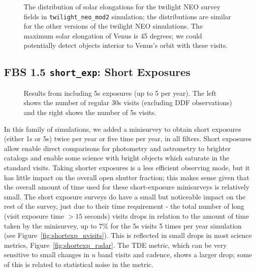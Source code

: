 \begin{figure}
\caption{The distribution of solar elongations for the twilight NEO survey fields in {\tt twilight\_neo\_mod2} simulation; the distributions are similar for the other versions of the twilight NEO simulations. The maximum solar elongation of Venus is 45 degrees; we could potentially detect objects interior to Venus's orbit with these visits.}
\label{fig:twilight_solarelong}
\end{figure}

\subsection{FBS 1.5 {\tt short\_exp}: Short Exposures}\label{ss:shortexp}

\begin{figure}
\caption{Results from including 5s exposures (up to 5 per year). The left shows the number of regular 30s visits (excluding DDF observations) and the right shows the number of 5s visits.}
\end{figure}

In this family of simulations, we added a minisurvey to obtain short exposures (either 1s or 5s) twice per year or five time per year, in all filters. Short exposures allow enable direct comparisons for photometry and astrometry to brighter catalogs and enable some science with bright objects which saturate in the standard visits. Taking shorter exposures is a less efficient observing mode, but it has little impact on the overall open shutter fraction; this makes sense given that the overall amount of time used for these short-exposure minisurveys is relatively small. The short exposure surveys do have a small but noticeable impact on the rest of the survey, just due to their time requirement - the total number of long (visit exposure time $>15$ seconds) visits drops in relation to the amount of time taken by the minisurvey, up to 7\% for the 5s visits 5 times per year simulation (see Figure~\ref{fig:shortexp_nvisits}). This is reflected in small drops in most science metrics, Figure~\ref{fig:shortexp_radar}. The TDE metric, which can be very sensitive to small changes in $u$ band visits and cadence, shows a larger drop; some of this is related to statistical noise in the metric. 


